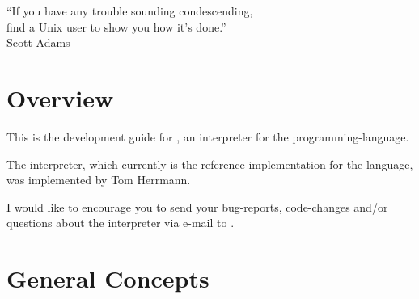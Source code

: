 


\globalDate{\today}
\globalKeywords{}







\begin{titlepage}
\maketitle

\vfill

\begin{center}
\Large
``If you have any trouble sounding condescending,\\
find a Unix user to show you how it's done.''\\
Scott Adams
\end{center}

\vfill
\tableofcontents
\end{titlepage}

\section{Overview}

This is the development guide for \setlX, an interpreter for the \SetlX{} programming-language.

The \setlX{} interpreter, which currently is the reference implementation for the \SetlX{} language, was implemented by Tom Herrmann. 

I would like to encourage you to send your bug-reports, code-changes and\slash{}or questions about the \setlX{} interpreter via e-mail to .

\section{General Concepts}

